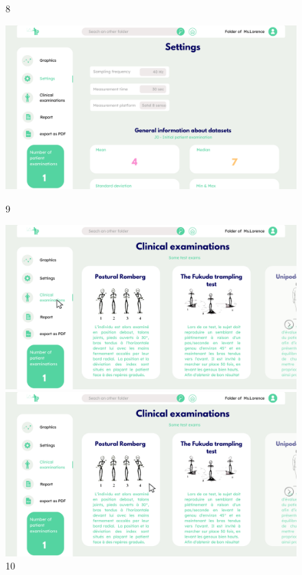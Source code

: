 \begin{figure}[H]
\begin{minipage}{0.3\textwidth}
        \caption*{8}
    \end{minipage}
    \begin{minipage}{0.3\textwidth}
        \centering
        \includegraphics[width=\textwidth]{images/Prototype/visualiser des données clés du jeu de données étudié.png}
        \caption*{9}
    \end{minipage}
    \begin{minipage}{0.3\textwidth}
        \centering
        \includegraphics[width=\textwidth]{images/Prototype/10.png}
        \caption*{10}
    \end{minipage}
    \begin{minipage}{0.3\textwidth}
        \centering
        \includegraphics[width=\textwidth]{images/Prototype/11.png}

\end{minipage}
\end{figure}
